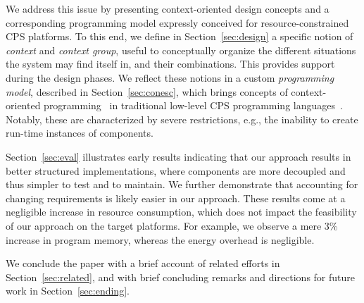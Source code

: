 We address this issue by presenting context-oriented design concepts
and a corresponding programming model expressly conceived for
resource-constrained CPS platforms. To this end, we define in
Section~\ref{sec:design} a specific notion of \emph{context} and
\emph{context group}, useful to conceptually organize the different
situations the system may find itself in, and their combinations. This
provides support during the design phases. We reflect these notions in
a custom \emph{programming model}, described in
Section~\ref{sec:conesc}, which brings concepts of context-oriented
programming~\cite{Hirschfeld08} in traditional low-level CPS programming
languages~\cite{gay03nesc}. Notably, these are characterized by severe restrictions,
e.g., the inability to create run-time instances of components.

Section~\ref{sec:eval} illustrates early results indicating that our
approach results in better structured implementations, where
components are more decoupled and thus simpler to test and to
maintain. We further demonstrate that accounting for changing
requirements is likely easier in our approach. These results come at a
negligible increase in resource consumption, which does not impact the
feasibility of our approach on the target platforms. For example, we
observe a mere 3\% increase in program memory, whereas the energy
overhead is negligible.

We conclude the paper with a brief account of related efforts in
Section~\ref{sec:related}, and with brief concluding remarks and
directions for future work in Section~\ref{sec:ending}.







